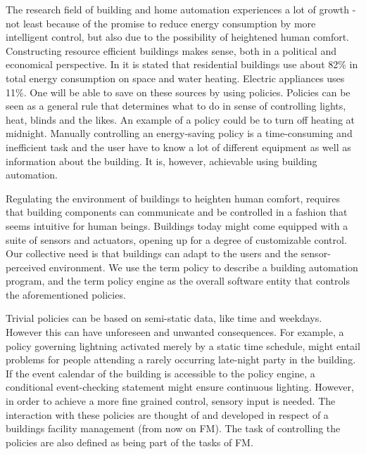 The research field of building and home automation experiences a lot of growth - not least because of the promise to reduce energy consumption by more intelligent control, but also due to the possibility of heightened human comfort. Constructing resource efficient buildings makes sense, both in a political and economical perspective. In \cite{janssen2004towards} it is stated that residential buildings use about 82\% in total energy consumption on space and water heating. Electric appliances uses 11\%. One will be able to save on these sources by using policies. Policies can be seen as a general rule that determines what to do in sense of controlling lights, heat, blinds and the likes. An example of a policy could be to turn off heating at midnight. Manually controlling an energy-saving policy is a time-consuming and inefficient task and the user have to know a lot of different equipment as well as information about the building. It is, however, achievable using building automation. 

Regulating the environment of buildings to heighten human comfort, 
requires that building components can communicate and be controlled in a fashion that seems intuitive for human beings. Buildings today might come equipped with a suite of sensors and actuators, opening up for a degree of customizable control. Our collective need is that buildings can adapt to the users and the sensor-perceived environment. We use the term policy to describe a building automation program, and the term policy engine as the overall software entity that controls the aforementioned policies.


Trivial policies can be based on semi-static data, like time and weekdays. However this can have unforeseen and unwanted consequences. For example, a policy governing lightning activated merely by a static time schedule, might entail problems for people attending a rarely occurring late-night party in the building. If the event calendar of the building is accessible to the policy engine, a conditional event-checking statement might ensure continuous lighting. However, in order to achieve a more fine grained control, sensory input is needed. The interaction with these policies are thought of and developed in respect of a buildings facility management (from now on FM). The task of controlling the policies are also defined as being part of the tasks of FM.

